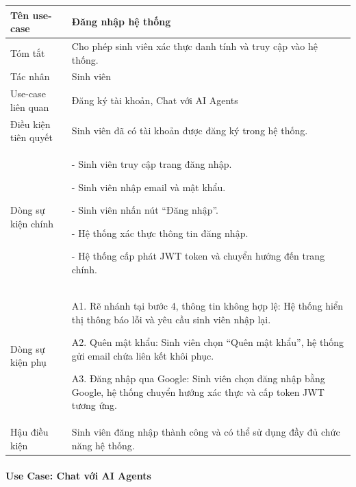 \begin{longtable}{|>{\raggedright\arraybackslash}p{4.2cm}|>{\raggedright\arraybackslash}p{9.8cm}|}
	\hline
	Tên use-case & Đăng nhập hệ thống \\ \hline
	Tóm tắt & Cho phép sinh viên xác thực danh tính và truy cập vào hệ thống. \\ \hline
	Tác nhân & Sinh viên \\ \hline
	Use-case liên quan & Đăng ký tài khoản, Chat với AI Agents \\ \hline
	Điều kiện tiên quyết & Sinh viên đã có tài khoản được đăng ký trong hệ thống. \\ \hline
	Dòng sự kiện chính &
	
		
- Sinh viên truy cập trang đăng nhập.
		
- Sinh viên nhập email và mật khẩu.
		
- Sinh viên nhấn nút ``Đăng nhập''.
		
- Hệ thống xác thực thông tin đăng nhập.
		
- Hệ thống cấp phát JWT token và chuyển hướng đến trang chính.
	 \\ \hline
	Dòng sự kiện phụ & A1. Rẽ nhánh tại bước 4, thông tin không hợp lệ: Hệ thống hiển thị thông báo lỗi và yêu cầu sinh viên nhập lại.\par\medskip
	A2. Quên mật khẩu: Sinh viên chọn ``Quên mật khẩu'', hệ thống gửi email chứa liên kết khôi phục.\par\medskip
	A3. Đăng nhập qua Google: Sinh viên chọn đăng nhập bằng Google, hệ thống chuyển hướng xác thực và cấp token JWT tương ứng. \\ \hline
	Hậu điều kiện & Sinh viên đăng nhập thành công và có thể sử dụng đầy đủ chức năng hệ thống. \\ \hline
\end{longtable}

\paragraph{Use Case: Chat với AI Agents}
\label{sec:uc-chat-ai}

